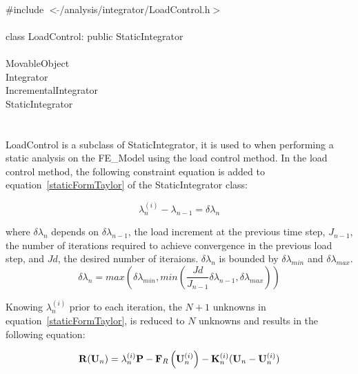 
   \\
\indent \#include $<\tilde{ }$/analysis/integrator/LoadControl.h$>$  \\

  \\
\indent class LoadControl: public StaticIntegrator  \\

 \\
\indent MovableObject \\
\indent\indent Integrator \\
\indent\indent\indent IncrementalIntegrator \\
\indent\indent\indent\indent StaticIntegrator \\
\indent\indent\indent\indent{} \\

 \\ 
\indent LoadControl is a subclass of StaticIntegrator, it is
used to when performing a static analysis on the FE\_Model using the
load control method. In the load control method, the following
constraint equation is added to equation~\ref{staticFormTaylor} of the
StaticIntegrator class: 

\[ 
\lambda_n^{(i)} - \lambda_{n-1} = \delta \lambda_n
\]

\noindent where $\delta \lambda_n$ depends on $\delta \lambda_{n-1}$,
the load increment at the previous time step, $J_{n-1}$,
the number of iterations required to achieve convergence in the
previous load step, and $Jd$, the desired number of iteraions. $\delta
\lambda_n$ is bounded by $\delta \lambda_{min}$  and $\delta \lambda_{max}$. \\


\[ 
\delta \lambda_n = max \left( \delta \lambda_{min}, min \left(
\frac{Jd}{J_{n-1}} \delta \lambda_{n-1}, \delta \lambda_{max} \right) \right)
\]

Knowing $\lambda_n^{(i)}$ prior to each iteration, the $N+1$ unknowns
in equation~\ref{staticFormTaylor}, is reduced to $N$ unknowns and
results in the following equation:

\begin{equation} 
{\bf R}({\bf U}_{n}) = \lambda_n^{(i)} {\bf P} 
 - {\bf F}_{R}\left({\bf U}_{n}^{(i)} \right) - 
{\bf K}_n^{(i)} 
({\bf U}_{n} - {\bf U}_{n}^{(i)})  
\label{staticFormLoadControl}
\end{equation} 

